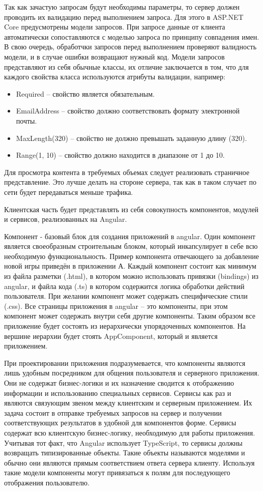 Так как зачастую запросам будут необходимы параметры, то сервер должен проводить их валидацию перед выполнением запроса. Для этого в ASP.NET Core предусмотрены модели запросов.
При запросе данные от клиента автоматически сопоставляются с моделью запроса по принципу совпадения имен. В свою очередь, обработчки запросов перед выполнением проверяют валидность модели, и в случае ошибки возвращают нужный код.
Модели запросов представляют из себя обычные классы, их отличие заключается в том, что для каждого свойства класса используются атрибуты валидации, например:
\begin{itemize}
	\item Required -- свойство является обязательным.
	\item EmailAddress -- свойство должно соответствовать формату электронной почты.
	\item MaxLength(320) -- свойство не должно превышать заданную длину (320). 
	\item Range(1, 10) -- свойство должно находится в диапазоне от 1 до 10.
\end{itemize} 

Для просмотра контента в требуемых объемах следует реализовать страничное представление. Это лучше делать на стороне сервера, так как в таком случает по сети будет передаваться меньше трафика.

Клиентская часть будет представлять из себя совокупность компонентов, модулей и сервисов, реализованных на Angular.

Компонент - базовый блок для создания приложений в angular. Один компонент является своеобразным строительным блоком, который инкапсулирует в себе всю необходимую функциональность.
Пример компонента отвечающего за добавление новой игры приведён в приложении А.
Каждый компонент состоит как минимум из файла разметки (.html), в котором можно использовать привязки (bindings) из angular, и файла кода (.ts) в котором содержится логика обработки действий пользователя.
При желании компонент может содержать специфические стили (.css).
Все страницы приложения в angular -- это компоненты, при этом компонент может содержать внутри себя другие компоненты. Таким образом все приложение будет состоять из иерархически упорядоченных компонентов.
На вершине иерархии будет стоять AppComponent, который и является приложением.

При проектировании приложения подразумевается, что компоненты являются лишь удобным посредником для общения пользователя и серверного приложения. Они не содержат бизнес-логики и их назначение сводится к 
отображению информации и использованию специальных сервисов. Сервисы как раз и являются связующим звеном между клиентским и серверным приложением. Их задача состоит в отправке требуемых запросов на сервер и
получении соответствующих результатов в удобной для компонентов форме. Сервисы содержат всю клиентскую бизнес-логику, необходимую для работы приложения. Учитывая тот факт, что Angular использует TypeScript,
то сервисы должны возвращать типизированные объекты. Такие объекты называются моделями и обычно они являются прямым соответствием ответа сервера клиенту. Используя такие модели компоненты могут 
привязаться к полям для последующего отображения пользователю.

